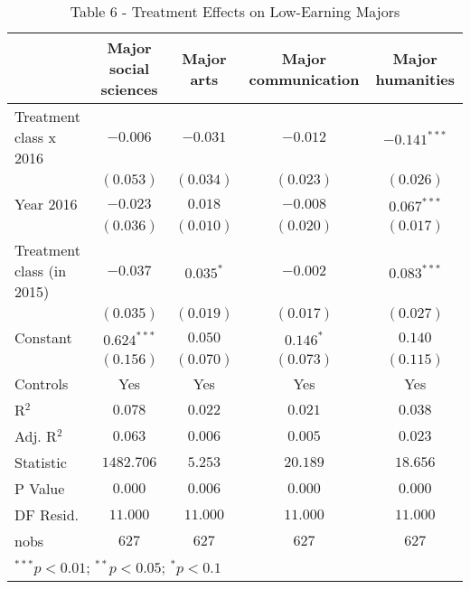 
\begin{table}
\caption{Table 6 - Treatment Effects on Low-Earning Majors}
\begin{center}
\begin{tabular}{l c c c c}
\hline
 & Major social sciences & Major arts & Major communication & Major humanities \\
\hline
Treatment class x 2016    & $-0.006$      & $-0.031$    & $-0.012$    & $-0.141^{***}$ \\
                          & $(0.053)$     & $(0.034)$   & $(0.023)$   & $(0.026)$      \\
Year 2016                 & $-0.023$      & $0.018$     & $-0.008$    & $0.067^{***}$  \\
                          & $(0.036)$     & $(0.010)$   & $(0.020)$   & $(0.017)$      \\
Treatment class (in 2015) & $-0.037$      & $0.035^{*}$ & $-0.002$    & $0.083^{***}$  \\
                          & $(0.035)$     & $(0.019)$   & $(0.017)$   & $(0.027)$      \\
Constant                  & $0.624^{***}$ & $0.050$     & $0.146^{*}$ & $0.140$        \\
                          & $(0.156)$     & $(0.070)$   & $(0.073)$   & $(0.115)$      \\
\hline
Controls                  & Yes           & Yes         & Yes         & Yes            \\
R$^2$                     & $0.078$       & $0.022$     & $0.021$     & $0.038$        \\
Adj. R$^2$                & $0.063$       & $0.006$     & $0.005$     & $0.023$        \\
Statistic                 & $1482.706$    & $5.253$     & $20.189$    & $18.656$       \\
P Value                   & $0.000$       & $0.006$     & $0.000$     & $0.000$        \\
DF Resid.                 & $11.000$      & $11.000$    & $11.000$    & $11.000$       \\
nobs                      & $627$         & $627$       & $627$       & $627$          \\
\hline
\multicolumn{5}{l}{\scriptsize{$^{***}p<0.01$; $^{**}p<0.05$; $^{*}p<0.1$}}
\end{tabular}
\label{table:coefficients}
\end{center}
\end{table}
